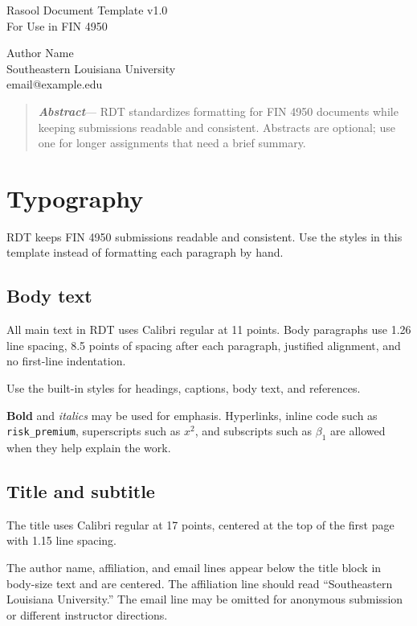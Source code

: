 \documentclass[11pt,letterpaper]{article}
\newenvironment{rdtabstract}{\begin{quote}\noindent\textbf{\textit{Abstract}}---}{\end{quote}}
\begin{document}
\begin{center}
{\fontsize{17}{19.55}\selectfont Rasool Document Template v1.0\\
For Use in FIN 4950\par}
\vspace{5.5pt}
\vspace{5.5pt}
Author Name\\
Southeastern Louisiana University\\
email@example.edu
\end{center}

\begin{rdtabstract}
RDT standardizes formatting for FIN 4950 documents while keeping
submissions readable and consistent. Abstracts are optional; use one
for longer assignments that need a brief summary.
\end{rdtabstract}

\section{Typography}

RDT keeps FIN 4950 submissions readable and consistent. Use the styles
in this template instead of formatting each paragraph by hand.

\subsection{Body text}

All main text in RDT uses Calibri regular at 11 points.
Body paragraphs use 1.26 line spacing, 8.5 points of spacing after each
paragraph, justified alignment, and no first-line indentation.

Use the built-in styles for headings, captions, body text, and
references.

\textbf{Bold} and \textit{italics} may be used for emphasis. Hyperlinks,
inline code such as \texttt{risk\_premium}, superscripts such as
\(x^2\), and subscripts such as \(\beta_1\) are allowed when they help
explain the work.

\subsection{Title and subtitle}

The title uses Calibri regular at 17 points, centered at the top of the
first page with 1.15 line spacing.

The author name, affiliation, and email lines appear below the title
block in body-size text and are centered. The affiliation line should
read ``Southeastern Louisiana University.'' The email line may be
omitted for anonymous submission or different instructor directions.
\end{document}
